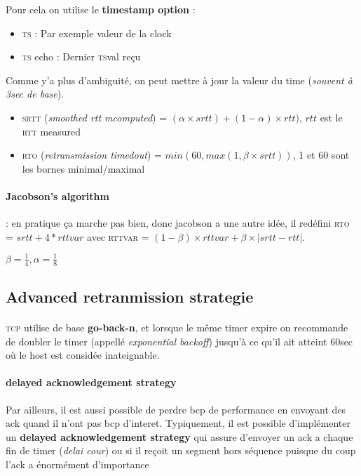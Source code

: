 \documentclass{report}
\begin{document}
Pour cela on utilise le \textbf{timestamp option} :
\begin{itemize}
    \item \textsc{ts} : Par exemple valeur de la clock
    \item \textsc{ts} echo : Dernier \textsc{ts}val reçu\\
\end{itemize}


Comme y'a plus d'ambiguité, on peut mettre à jour la valeur du time (\textit{souvent à 3sec
de base}).

\begin{itemize}
    \item \textsc{srtt} (\textit{smoothed rtt mcomputed}) = $ (\alpha \times srtt) + (1-\alpha) \times rtt)$, $rtt$ est le \textsc{rtt} measured
    \item \textsc{rto} (\textit{retransmission timedout}) = $min(60, max(1, \beta \times srtt))$, 1 et 60 sont les bornes minimal/maximal
\end{itemize}

\paragraph{Jacobson's algorithm} : en pratique ça marche pas bien, donc jacobson a une
autre idée, il redéfini \textsc{rto} = $srtt + 4*rttvar$ avec \textsc{rttvar} = $(1-\beta) \times rttvar + \beta \times |srtt - rtt|$.

$\beta = \frac{1}{4}, \alpha = \frac{1}{8}$

\subsection{Advanced retranmission strategie}

\paragraph{}
\textsc{tcp} utilise de base \textbf{go-back-n}, et lorsque le même timer
expire on recommande de doubler le timer (appellé \textit{exponential backoff}) jusqu'à
ce qu'il ait atteint 60sec où le host est considée inateignable.

\paragraph{delayed acknowledgement strategy}
Par ailleurs, il est aussi possible de perdre bcp de performance en envoyant des
ack quand il n'ont pas bcp d'interet. Typiquement, il est possible d'implémenter
un \textbf{delayed acknowledgement strategy} qui assure d'envoyer un ack a chaque fin
de timer (\textit{delai cour}) ou si il reçoit un segment hors séquence puisque du coup
l'ack a énormément d'importance
\end{document}
